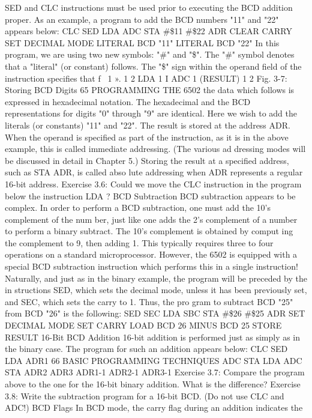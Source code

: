 \documentclass{book}
\begin{document}
SED and CLC instructions must be used prior to executing the
BCD addition proper. As an example, a program to add the BCD
numbers "11" and "22" appears below:
CLC
SED
LDA
ADC
STA
#\$11
#\$22
ADR
CLEAR CARRY
SET DECIMAL MODE
LITERAL BCD "11"
LITERAL BCD "22"
In this program, we are using two new symbols: "#" and "\$".
The "#" symbol denotes that a "literal" (or constant) follows. The
"\$" sign within the operand field of the instruction specifies that
f
\
1 ».
1
2
LDA
1
I
ADC
1
(RESULT)
1
2
Fig. 3-7: Storing BCD Digits
65
PROGRAMMING THE 6502
the data which follows is expressed in hexadecimal notation. The
hexadecimal and the BCD representations for digits "0" through
"9" are identical. Here we wish to add the literals (or constants)
"11" and "22". The result is stored at the address ADR. When the
operand is specified as part of the instruction, as it is in the above
example, this is called immediate addressing. (The various ad
dressing modes will be discussed in detail in Chapter 5.) Storing
the result at a specified address, such as STA ADR, is called abso
lute addressing when ADR represents a regular 16-bit address.
Exercise 3.6: Could we move the CLC instruction in the program
below the instruction LDA ?
BCD Subtraction
BCD subtraction appears to be complex. In order to perform a
BCD subtraction, one must add the 10's complement of the num
ber, just like one adds the 2's complement of a number to perform
a binary subtract. The 10's complement is obtained by comput
ing the complement to 9, then adding 1. This typically requires
three to four operations on a standard microprocessor. However,
the 6502 is equipped with a special BCD subtraction instruction
which performs this in a single instruction! Naturally, and just as
in the binary example, the program will be preceded by the in
structions SED, which sets the decimal mode, unless it has been
previously set, and SEC, which sets the carry to 1. Thus, the pro
gram to subtract BCD "25" from BCD "26" is the following:
SED
SEC
LDA
SBC
STA
#\$26
#\$25
ADR
SET DECIMAL MODE
SET CARRY
LOAD BCD 26
MINUS BCD 25
STORE RESULT
16-Bit BCD Addition
16-bit addition is performed just as simply as in the binary
case. The program for such an addition appears below:
CLC
SED
LDA ADR1
66
BASIC PROGRAMMING TECHNIQUES
ADC
STA
LDA
ADC
STA
ADR2
ADR3
ADR1-1
ADR2-1
ADR3-1
Exercise 3.7: Compare the program above to the one for the 16-bit
binary addition. What is the difference?
Exercise 3.8: Write the subtraction program for a 16-bit BCD. (Do
not use CLC and ADC!)
BCD Flags
In BCD mode, the carry flag during an addition indicates the
\end{document}
